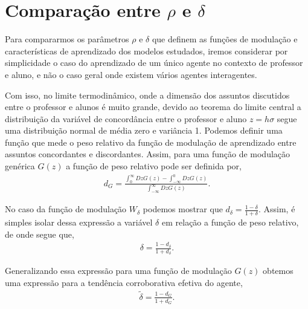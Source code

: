 \section{Comparação entre $\rho$ e $\delta$} %
\label{sec:rho_delta}

Para compararmos os parâmetros $\rho$ e $\delta$ que definem as funções
de modulação e características de aprendizado dos modelos estudados, iremos
considerar por simplicidade o caso do aprendizado de um único agente no
contexto de professor e aluno, e não o caso geral onde existem vários
agentes interagentes.

Com isso, no limite termodinâmico, onde a dimensão dos assuntos discutidos
entre o professor e alunos é muito grande, devido ao teorema do limite
central \cite{Engel2004} a distribuição da variável de concordância
entre o professor e aluno $ z = h \sigma$ segue uma distribuição normal de
média zero e variância 1. Podemos definir uma função que mede
o peso relativo da função de modulação de aprendizado entre assuntos
concordantes e discordantes. Assim, para uma função de modulação genérica
$G(z)$ a função de peso relativo pode ser definida por,
\begin{align}
    d_G = \frac{\int_0^\infty D z G(z) - \int_{-\infty}^0 D z G(z)}
            {\int_{-\infty}^\infty D z G(z)}.
\end{align}

No caso da função de modulação $W_\delta$ podemos mostrar que 
$
d_\delta = \frac{1 - \delta}{1 + \delta}.
$
Assim, é simples isolar dessa expressão a variável $\delta$ em
relação a função de peso relativo, de onde segue que, 
\begin{align}
    \delta = \frac{1 - d_\delta}{1 + d_\delta}.
\end{align}

Generalizando essa expressão para uma função de modulação $G(z)$
obtemos uma expressão para a tendência corroborativa efetiva do agente,
\begin{align}
    \tilde \delta = \frac{1 - d_G}{1 + d_G}.
\end{align}

